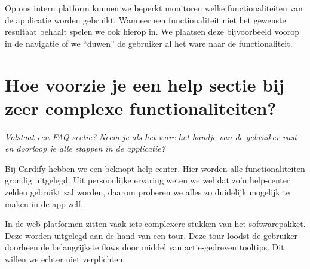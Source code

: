Op ons intern platform kunnen we beperkt monitoren welke functionaliteiten van de applicatie worden gebruikt. Wanneer een functionaliteit niet het gewenste resultaat behaalt spelen we ook hierop in. We plaatsen deze bijvoorbeeld voorop in de navigatie of we ``duwen'' de gebruiker al het ware naar de functionaliteit.

\section[Vraag 5]{Hoe voorzie je een help sectie bij zeer complexe functionaliteiten?}

\textit{Volstaat een FAQ sectie? Neem je als het ware het handje van de gebruiker vast en doorloop je alle stappen in de applicatie?}

Bij Cardify hebben we een beknopt help-center. Hier worden alle functionaliteiten grondig uitgelegd. Uit persoonlijke ervaring weten we wel dat zo’n help-center zelden gebruikt zal worden, daarom proberen we alles zo duidelijk mogelijk te maken in de app zelf.

In de web-platformen zitten vaak iets complexere stukken van het softwarepakket. Deze worden uitgelegd aan de hand van een tour. Deze tour loodst de gebruiker doorheen de belangrijkste flows door middel van actie-gedreven tooltips. Dit willen we echter niet verplichten.
